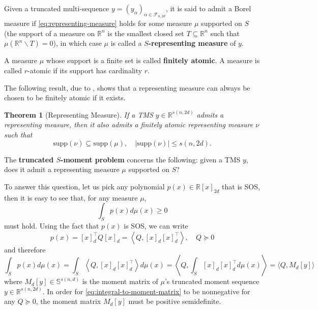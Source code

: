 \documentclass[
]{book}
\newtheorem{theorem}{Theorem}[chapter]
\theoremstyle{definition}
\theoremstyle{definition}
\theoremstyle{definition}
\theoremstyle{definition}
\theoremstyle{remark}
\begin{document}
Given a truncated multi-sequence \(y = (y_\alpha)_{\alpha \in \mathcal{F}_{n,2d}}\), it is said to admit a Borel measure if \eqref{eq:representing-measure} holds for some measure \(\mu\) supported on \(S\) (the support of a measure on \(\mathbb{R}^{n}\) is the smallest closed set \(T \subseteq \mathbb{R}^{n}\) such that \(\mu(\mathbb{R}^{n} \backslash T) = 0\)), in which case \(\mu\) is called a \textbf{\(S\)-representing measure} of \(y\).

A measure \(\mu\) whose support is a finite set is called \textbf{finitely atomic}. A measure is called \(r\)-atomic if its support has cardinality \(r\).

The following result, due to \citep{bayer06ams-proof}, shows that a representing measure can always be chosen to be finitely atomic if it exists.

\begin{theorem}[Representing Measure]
\protect\hypertarget{thm:RepresentingMeasure}{}\label{thm:RepresentingMeasure}If a TMS \(y \in \mathbb{R}^{s(n,2d)}\) admits a representing measure, then it also admits a
finitely atomic representing measure \(\nu\) such that
\[
\mathrm{supp}(\nu) \subseteq \mathrm{supp}(\mu), \quad \left\vert \mathrm{supp}(\nu) \right\vert \leq s(n,2d).
\]
\end{theorem}

The \textbf{truncated \(S\)-moment problem} concerns the following: given a TMS \(y\), does it admit a representing measure \(\mu\) supported on \(S\)?

To answer this question, let us pick any polynomial \(p(x) \in \mathbb{R}[x]_{2d}\) that is SOS, then it is easy to see that, for any measure \(\mu\),
\[
\int_S p(x) d\mu(x) \geq 0
\]
must hold. Using the fact that \(p(x)\) is SOS, we can write
\[
p(x) = [x]_d^\top Q [x]_d = \left\langle Q, [x]_d [x]_d^\top \right\rangle, \quad Q \succeq 0
\]
and therefore
\begin{equation}
\int_S p(x) d\mu(x) = \int_S \left\langle Q, [x]_d [x]_d^\top \right\rangle d \mu(x) = \left\langle Q,  \int_S [x]_d [x]_d^\top d \mu(x)  \right\rangle = \langle Q, M_d[y] \rangle
\label{eq:integral-to-moment-matrix}
\end{equation}
where \(M_d[y] \in \mathbb{S}^{s(n,d)}\) is the moment matrix of \(\mu\)'s truncated moment sequence \(y \in \mathbb{R}^{s(n,2d)}\). In order for \eqref{eq:integral-to-moment-matrix} to be nonnegative for any \(Q \succeq 0\), the moment matrix \(M_d[y]\) must be positive semidefinite.
\end{document}
